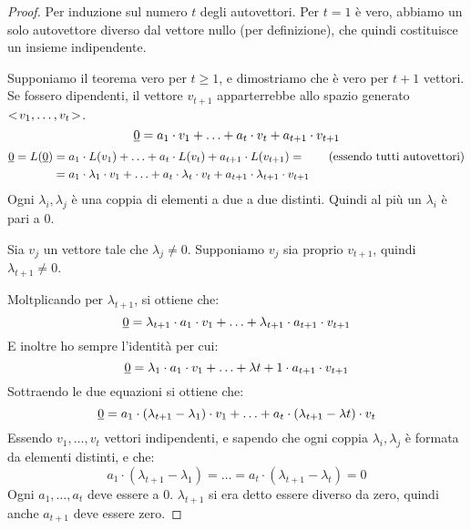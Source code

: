 \begin{proof}
Per induzione sul numero $t$ degli autovettori. Per $t = 1$ \`e vero, abbiamo un solo autovettore diverso dal vettore nullo (per definizione), che quindi costituisce un insieme indipendente.

Supponiamo il teorema vero per $t \ge 1$, e dimostriamo che \`e vero per $t + 1$ vettori. Se fossero dipendenti, il vettore $v_{t+1}$ apparterrebbe allo spazio generato $<\!{v_1, \ldots, v_t}\!>$.
\[
\underline{0} = a_1 \cdot v_1 + \ldots + a_t \cdot v_t + a_{t+1} \cdot v_{t+1}
\]
\begin{align*}
\underline{0} = L( \underline{0} ) &= a_1 \cdot L(v_1) + \ldots + a_t \cdot L(v_t) + a_{t+1} \cdot L(v_{t+1}) = \tag{essendo tutti autovettori} \\
&= a_1 \cdot \lambda_1 \cdot v_1 + \ldots + a_t \cdot \lambda_t \cdot v_t + a_{t+1} \cdot \lambda_{t+1} \cdot v_{t+1}
\end{align*}
Ogni $\lambda_i, \lambda_j$ \`e una coppia di elementi a due a due distinti. Quindi al pi\`u un $\lambda_i$ \`e pari a 0.

Sia $v_j$ un vettore tale che $\lambda_j \neq 0$. Supponiamo $v_j$ sia proprio $v_{t+1}$, quindi $\lambda_{t+1} \neq 0$.

Moltplicando per $\lambda_{t+1}$, si ottiene che:
\[
\underline{0} = \lambda_{t+1} \cdot a_1 \cdot v_1 + \ldots + \lambda_{t+1} \cdot a_{t+1} \cdot v_{t+1}
\]
E inoltre ho sempre l'identit\`a per cui:
\[
\underline{0} = \lambda_{1} \cdot a_{1} \cdot v_{1} + \ldots + \lambda{t+1} \cdot a_{t+1} \cdot v_{t+1}
\]
Sottraendo le due equazioni si ottiene che:
\[
\underline{0} = a_1 \cdot (\lambda_{t+1} - \lambda_{1}) \cdot v_1 + \ldots + a_t \cdot (\lambda_{t+1} - \lambda{t}) \cdot v_t
\]
Essendo $v_1, \ldots, v_t$ vettori indipendenti, e sapendo che ogni coppia $\lambda_i, \lambda_j$ \`e formata da elementi distinti, e che:
\[
a_1 \cdot (\lambda_{t+1} - \lambda_1) = \ldots = 
a_t \cdot (\lambda_{t+1} - \lambda_t) = 0
\]
Ogni $a_1, \ldots, a_t$ deve essere a 0. $\lambda_{t+1}$ si era detto essere diverso da zero, quindi anche $a_{t+1}$ deve essere zero.
\end{proof}


